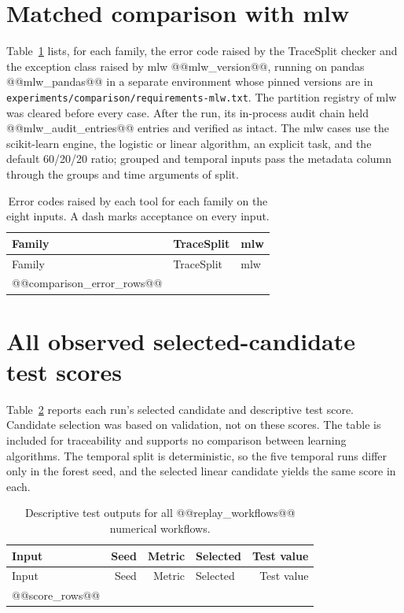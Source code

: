 \documentclass[11pt,letterpaper]{article}
\begin{document}
\section{Matched comparison with mlw}
Table~\ref{tab:comparisonerrors} lists, for each family, the error code raised by the TraceSplit checker and the exception class raised by mlw @@mlw_version@@, running on pandas @@mlw_pandas@@ in a separate environment whose pinned versions are in \texttt{experiments/comparison/requirements-mlw.txt}. The partition registry of mlw was cleared before every case. After the run, its in-process audit chain held @@mlw_audit_entries@@ entries and verified as intact. The mlw cases use the scikit-learn engine, the logistic or linear algorithm, an explicit task, and the default 60/20/20 ratio; grouped and temporal inputs pass the metadata column through the groups and time arguments of split.

\begin{longtable}{p{}p{}p{}}
\caption{Error codes raised by each tool for each family on the eight inputs. A dash marks acceptance on every input.}\label{tab:comparisonerrors}\\
\toprule Family & TraceSplit & mlw\\\midrule\endfirsthead
\toprule Family & TraceSplit & mlw\\\midrule\endhead
@@comparison_error_rows@@
\bottomrule
\end{longtable}

\section{All observed selected-candidate test scores}
Table~\ref{tab:scores} reports each run's selected candidate and descriptive test score. Candidate selection was based on validation, not on these scores. The table is included for traceability and supports no comparison between learning algorithms. The temporal split is deterministic, so the five temporal runs differ only in the forest seed, and the selected linear candidate yields the same score in each.

\begin{longtable}{lrrlr}
\caption{Descriptive test outputs for all @@replay_workflows@@ numerical workflows.}\label{tab:scores}\\
\toprule Input & Seed & Metric & Selected & Test value\\\midrule\endfirsthead
\toprule Input & Seed & Metric & Selected & Test value\\\midrule\endhead
@@score_rows@@
\bottomrule\end{longtable}
\end{document}
